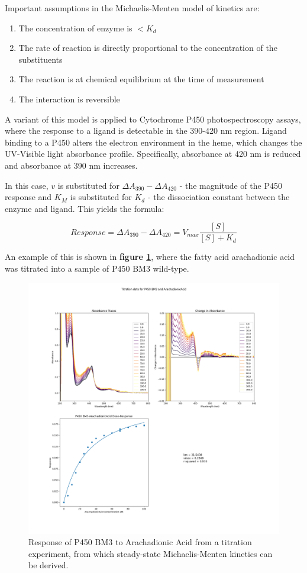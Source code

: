 \documentclass{article}
\begin{document}
Important assumptions in the Michaelis-Menten model of kinetics are:

\begin{enumerate}
	\item The concentration of enzyme is $< K_d$ 
	\item The rate of reaction is directly proportional to the concentration of the substituents
	\item The reaction is at chemical equilibrium at the time of measurement
	\item The interaction is reversible
\end{enumerate}

A variant of this model is applied to Cytochrome P450 photospectroscopy assays, where the response to a ligand is detectable in the 390-420 nm region.
Ligand binding to a P450 alters the electron environment in the heme, which changes the UV-Visible light absorbance profile.
Specifically, absorbance at 420 nm is reduced and absorbance at 390 nm increases.

In this case, $v$ is substituted for $\Delta A_{390} - \Delta A_{420}$ - the magnitude of the P450 response and $K_M$ is substituted for $K_d$ - the dissociation constant between the enzyme and ligand.
This yields the formula:

$$ Response = \Delta A_{390} - \Delta A_{420} = V_{max} \frac{[S]}{[S] + K_d} $$

An example of this is shown in \textbf{figure \ref{arachadionictitration}}, where the fatty acid arachadionic acid was titrated into a sample of P450 BM3 wild-type.

\begin{figure}
	\caption{\label{arachadionictitration} Response of P450 BM3 to Arachadionic Acid from a titration experiment, from which steady-state Michaelis-Menten kinetics can be derived.}
	\includegraphics[width = \textwidth]{img/ArachadionicAcid.png}
\end{figure}
\end{document}
